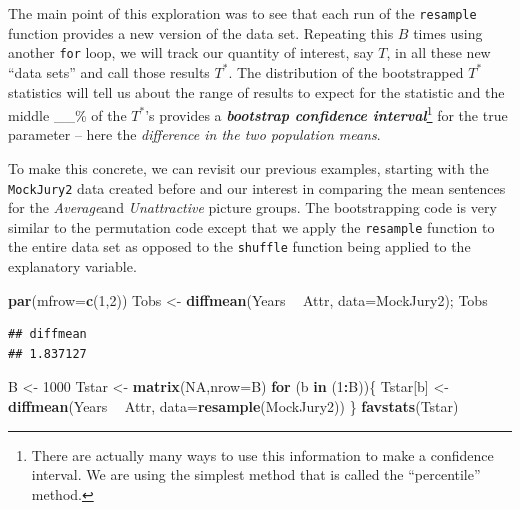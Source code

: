 \documentclass[]{book}
\newenvironment{Shaded}{\begin{snugshade}}{\end{snugshade}}
\newcommand{\KeywordTok}[1]{\textcolor[rgb]{0.13,0.29,0.53}{\textbf{#1}}}
\newcommand{\DataTypeTok}[1]{\textcolor[rgb]{0.13,0.29,0.53}{#1}}
\newcommand{\DecValTok}[1]{\textcolor[rgb]{0.00,0.00,0.81}{#1}}
\newcommand{\StringTok}[1]{\textcolor[rgb]{0.31,0.60,0.02}{#1}}
\newcommand{\OtherTok}[1]{\textcolor[rgb]{0.56,0.35,0.01}{#1}}
\newcommand{\ControlFlowTok}[1]{\textcolor[rgb]{0.13,0.29,0.53}{\textbf{#1}}}
\newcommand{\OperatorTok}[1]{\textcolor[rgb]{0.81,0.36,0.00}{\textbf{#1}}}
\newcommand{\NormalTok}[1]{#1}
\let\rmarkdownfootnote\footnote%
\def\footnote{\protect\rmarkdownfootnote}
\theoremstyle{definition}
\theoremstyle{definition}
\theoremstyle{remark}
\begin{document}
The main point of this exploration was to see that each run of the
\texttt{resample} function provides a new version of the data set.
Repeating this \(B\) times using another \texttt{for} loop, we will
track our quantity of interest, say \(T\), in all these new ``data
sets'' and call those results \(T^*\). The distribution of the
bootstrapped \(T^*\) statistics will tell us about the range of results
to expect for the statistic and the middle \_\_\% of the \(T^*\)'s
provides a \textbf{\emph{bootstrap confidence interval}}\footnote{There
  are actually many ways to use this information to make a confidence
  interval. We are using the simplest method that is called the
  ``percentile'' method.} for the true parameter -- here the
\emph{difference in the two population means}.

To make this concrete, we can revisit our previous examples, starting
with the \texttt{MockJury2} data created before and our interest in
comparing the mean sentences for the \emph{Average}and
\emph{Unattractive} picture groups. The bootstrapping code is very
similar to the permutation code except that we apply the
\texttt{resample} function to the entire data set as opposed to the
\texttt{shuffle} function being applied to the explanatory variable.

\begin{Shaded}
\begin{Highlighting}[]
\KeywordTok{par}\NormalTok{(}\DataTypeTok{mfrow=}\KeywordTok{c}\NormalTok{(}\DecValTok{1}\NormalTok{,}\DecValTok{2}\NormalTok{))}
\NormalTok{Tobs <-}\StringTok{ }\KeywordTok{diffmean}\NormalTok{(Years }\OperatorTok{~}\StringTok{ }\NormalTok{Attr, }\DataTypeTok{data=}\NormalTok{MockJury2); Tobs}
\end{Highlighting}
\end{Shaded}

\begin{verbatim}
## diffmean 
## 1.837127
\end{verbatim}

\begin{Shaded}
\begin{Highlighting}[]
\NormalTok{B <-}\StringTok{ }\DecValTok{1000}
\NormalTok{Tstar <-}\StringTok{ }\KeywordTok{matrix}\NormalTok{(}\OtherTok{NA}\NormalTok{,}\DataTypeTok{nrow=}\NormalTok{B)}
\ControlFlowTok{for}\NormalTok{ (b }\ControlFlowTok{in}\NormalTok{ (}\DecValTok{1}\OperatorTok{:}\NormalTok{B))\{}
\NormalTok{  Tstar[b] <-}\StringTok{ }\KeywordTok{diffmean}\NormalTok{(Years }\OperatorTok{~}\StringTok{ }\NormalTok{Attr, }\DataTypeTok{data=}\KeywordTok{resample}\NormalTok{(MockJury2))}
\NormalTok{  \}}
\KeywordTok{favstats}\NormalTok{(Tstar)}
\end{Highlighting}
\end{Shaded}
\end{document}
